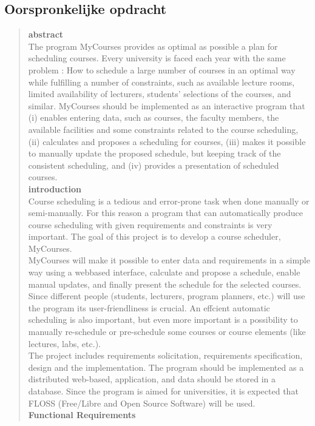 \documentclass{article}
\begin{document}
\subsection{Oorspronkelijke opdracht}
\begin{quotation}

\textbf{abstract}\\
The program MyCourses provides as optimal as possible a plan for scheduling courses. Every university is faced each year with the same problem : How to schedule a large number of courses in an optimal way while fulfilling a number of constraints, such as available lecture rooms, limited availability of lecturers, students' selections of the courses, and similar. MyCourses should be implemented as an interactive program that (i) enables entering data, such as courses, the faculty members, the available facilities and some constraints related to the course scheduling, (ii) calculates and proposes a scheduling for courses, (iii) makes it possible to manually update the proposed schedule, but keeping track of the consistent scheduling, and (iv) provides a presentation of scheduled courses.\\[3mm]
\textbf{introduction}\\
Course scheduling is a tedious and error-prone task when done manually or semi-manually. For this reason a program that can automatically produce course scheduling with given requirements and constraints is very important. The goal of this project is to develop a course scheduler, MyCourses.\\
MyCourses will make it possible to enter data and requirements in a simple way using a webbased interface, calculate and propose a schedule, enable manual updates, and finally present the schedule for the selected courses. Since different people (students, lecturers, program planners, etc.) will use the program its user-friendliness is crucial. An effcient automatic scheduling is also important, but even more important is a possibility to manually re-schedule or pre-schedule some courses or course elements (like lectures, labs, etc.).\\ The project includes requirements solicitation, requirements specification, design and the implementation. The program should be implemented as a distributed web-based, application, and data should be stored in a database. Since the program is aimed for universities, it is expected that FLOSS (Free/Libre and Open Source Software) will be used.\\[3mm]
\textbf{Functional Requirements}\\

\end{quotation}
\end{document}
